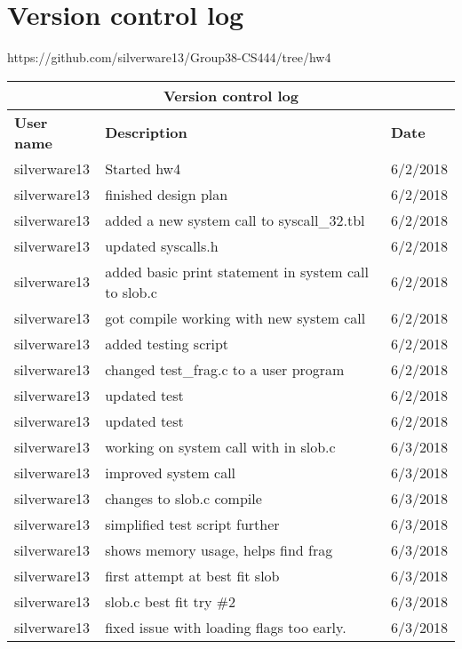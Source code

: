 \documentclass[journal,10pt,onecolumn,letterpaper,draftclsnofoot]{IEEEtran}
\begin{document}
\section{Version control log}
https://github.com/silverware13/Group38-CS444/tree/hw4
\bigskip
\centering
\begin{tabular}{ |p{3cm}|p{10cm}|p{3cm}|  }
 \hline
 \multicolumn{3}{|c|}{\textbf{Version control log}} \\
 \hline
 \textbf{User name} &\textbf{Description} &\textbf{Date}\\
 \hline
 silverware13   & Started hw4   &6/2/2018\\
 \hline
  silverware13   & finished design plan   &6/2/2018\\
 \hline
   silverware13   & added a new system call to syscall\_32.tbl  &6/2/2018\\
 \hline
    silverware13   & updated syscalls.h  &6/2/2018\\
 \hline
     silverware13   & added basic print statement in system call to slob.c  &6/2/2018\\
 \hline
      silverware13   & got compile working with new system call  &6/2/2018\\
 \hline
       silverware13   & added testing script  &6/2/2018\\
 \hline
        silverware13   & changed test\_frag.c to a user program  &6/2/2018\\
 \hline
         silverware13   & updated test &6/2/2018\\
 \hline
          silverware13   & updated test &6/2/2018\\
 \hline
          silverware13   & working on system call with in slob.c &6/3/2018\\
 \hline
           silverware13   & improved system call &6/3/2018\\
 \hline
            silverware13   & changes to slob.c compile &6/3/2018\\
 \hline
             silverware13   & simplified test script further &6/3/2018\\
 \hline
              silverware13   & shows memory usage, helps find frag &6/3/2018\\
 \hline
               silverware13   & first attempt at best fit slob &6/3/2018\\
 \hline
                silverware13   & slob.c best fit try \#2 &6/3/2018\\
 \hline
                 silverware13   & fixed issue with loading flags too early. &6/3/2018\\
 \hline
\end{tabular}
\end{document}
